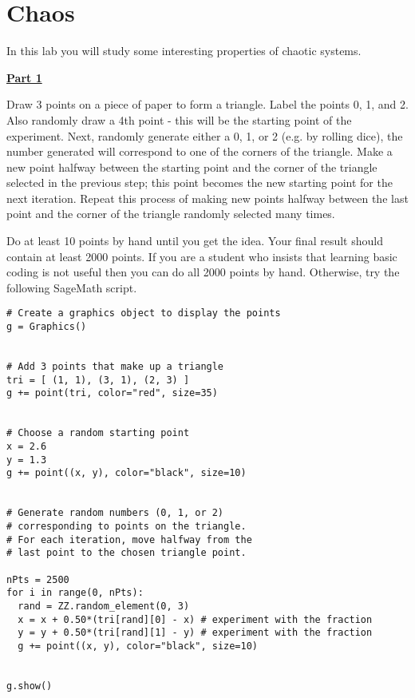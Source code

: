 \section{Chaos}

In this lab you will study some interesting properties of chaotic systems.

\vspace{\baselineskip}

\underline{\textbf{Part 1}} \par
Draw 3 points on a piece of paper to form a triangle.
Label the points 0, 1, and 2.
Also randomly draw a 4th point - this will be the starting point of the experiment.
Next, randomly generate either a 0, 1, or 2 (e.g. by rolling dice), the number generated will correspond to one of the corners of the triangle.
Make a new point halfway between the starting point and the corner of the triangle selected in the previous step; this point becomes the new starting point for the next iteration.
Repeat this process of making new points halfway between the last point and the corner of the triangle randomly selected many times.

\vspace{\baselineskip}

Do at least 10 points by hand until you get the idea.
Your final result should contain at least 2000 points.
If you are a student who insists that learning basic coding is not useful then you can do all 2000 points by hand.
Otherwise, try the following SageMath script.

\begin{verbatim}
# Create a graphics object to display the points
g = Graphics()


# Add 3 points that make up a triangle
tri = [ (1, 1), (3, 1), (2, 3) ]
g += point(tri, color="red", size=35)


# Choose a random starting point
x = 2.6 
y = 1.3 
g += point((x, y), color="black", size=10)


# Generate random numbers (0, 1, or 2)
# corresponding to points on the triangle.
# For each iteration, move halfway from the 
# last point to the chosen triangle point.

nPts = 2500
for i in range(0, nPts):
  rand = ZZ.random_element(0, 3)
  x = x + 0.50*(tri[rand][0] - x) # experiment with the fraction
  y = y + 0.50*(tri[rand][1] - y) # experiment with the fraction
  g += point((x, y), color="black", size=10)


g.show()
\end{verbatim}



\pagebreak \clearpage
